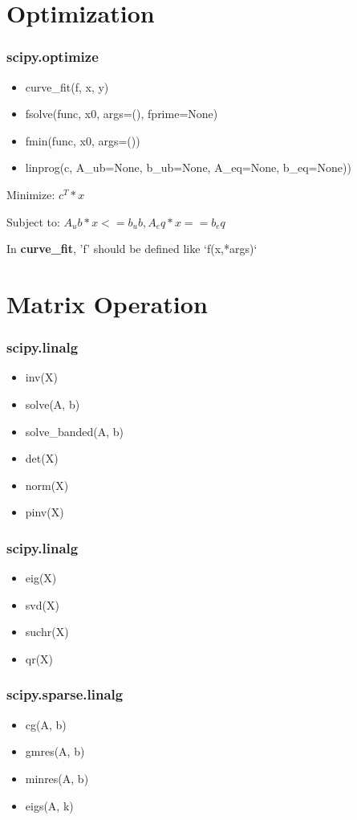 \documentclass[english, nochinese]{beamer}
\begin{document}
\section{Optimization}
\begin{frame}
\frametitle{scipy.optimize}
\begin{itemize}
\item curve\_fit(f, x, y)
\item  fsolve(func, x0, args=(), fprime=None)
\item  fmin(func, x0, args=())
\item linprog({c, A\_ub=None, b\_ub=None, A\_eq=None, b\_eq=None)})
\end{itemize}
Minimize:     $c^T * x$

Subject to:  $ A_ub * x <= b_ub, A_eq * x == b_eq$

In \textbf{curve\_fit}, 'f' should be defined like `f(x,*args)`

\end{frame}

\section{Matrix Operation}
\begin{frame}
\frametitle{scipy.linalg}
\begin{itemize}
\item inv(X)
\item solve(A, b)
\item solve\_banded(A, b)
\item det(X)
\item norm(X)
\item pinv(X)
\end{itemize}
\end{frame}

\begin{frame}
\frametitle{scipy.linalg}
\begin{itemize}
\item eig(X)
\item svd(X)
\item suchr(X)
\item qr(X)
\end{itemize}
\end{frame}

\begin{frame}
\frametitle{scipy.sparse.linalg}
\begin{itemize}
\item cg(A, b)
\item gmres(A, b)
\item minres(A, b)
\item eigs(A, k)
\end{itemize}
\end{frame}
\end{document}
